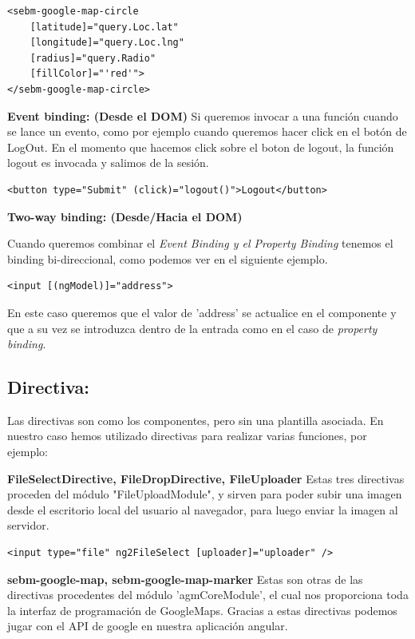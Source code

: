 \begin{lstlisting}
<sebm-google-map-circle
    [latitude]="query.Loc.lat"
    [longitude]="query.Loc.lng"
    [radius]="query.Radio"
    [fillColor]="'red'">
</sebm-google-map-circle>
\end{lstlisting}

\textbf{Event binding: (Desde el DOM)}
Si queremos invocar a una función cuando se lance un evento, como por ejemplo cuando queremos hacer click en el botón de LogOut. En el momento que hacemos click sobre el boton de logout, la función logout es invocada y salimos de la sesión.

\begin{lstlisting}
<button type="Submit" (click)="logout()">Logout</button>
\end{lstlisting}

\textbf{Two-way binding: (Desde/Hacia el DOM)}

Cuando queremos combinar el \textit{Event Binding y el Property Binding} tenemos el binding bi-direccional, como podemos ver en el siguiente ejemplo.

\begin{lstlisting}
<input [(ngModel)]="address">
\end{lstlisting}

En este caso queremos que el valor de 'address' se actualice en el componente y que a su vez se introduzca dentro de la entrada como en el caso de \textit{property binding}.

\subsection{Directiva: }Las directivas son como los componentes, pero sin una plantilla asociada. En nuestro caso hemos utilizado directivas para realizar varias funciones, por ejemplo:

\textbf{FileSelectDirective, FileDropDirective, FileUploader} Estas tres directivas proceden del módulo "FileUploadModule", y sirven para poder subir una imagen desde el escritorio local del usuario al navegador, para luego enviar la imagen al servidor.

\begin{lstlisting}
<input type="file" ng2FileSelect [uploader]="uploader" />
\end{lstlisting}
\textbf{sebm-google-map, sebm-google-map-marker} Estas son otras de las directivas procedentes del módulo 'agmCoreModule', el cual nos proporciona toda la interfaz de programación de GoogleMaps. Gracias a estas directivas podemos jugar con el API de google en nuestra aplicación angular.

